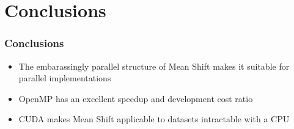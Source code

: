 \documentclass[xcolor=table]{beamer}
\begin{document}
\section{Conclusions}

\begin{frame}
\frametitle{Conclusions}
\begin{itemize}
\item The embarassingly parallel structure of Mean Shift makes it suitable for parallel implementations
\vspace{0.45cm}
\item OpenMP has an excellent speedup and development cost ratio
\vspace{0.45cm}
\item CUDA makes Mean Shift applicable to datasets intractable with a CPU
\end{itemize}
\end{frame}
\end{document}

